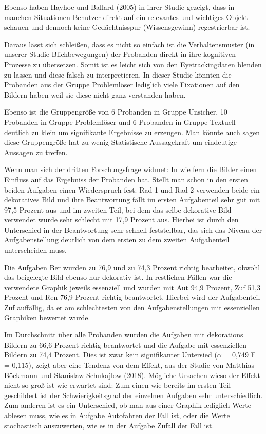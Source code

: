 Ebenso haben Hayhoe und Ballard (2005) in ihrer Studie gezeigt, dass in manchen Situationen Benutzer direkt auf ein relevantes und wichtiges Objekt schauen und dennoch keine Gedächtnisspur (Wissensgewinn) regestrierbar ist\cite{hayhoe2005eye}. 

Daraus lässt sich schleißen, dass es nicht so einfach ist die Verhaltensmuster (in unserer Studie Blichbewegungen) der Probanden direkt in ihre kognitiven Prozesse zu übersetzen. Somit ist es leicht sich von den Eyetrackingdaten blenden zu lassen und diese falsch zu interpretieren. In dieser Studie könnten die Probanden aus der Gruppe Problemlöser lediglich viele Fixationen auf den Bildern haben weil sie diese nicht ganz verstanden haben. 

Ebenso ist die Gruppengröße von 6 Probanden in Gruppe Unsicher, 10 Probanden in Gruppe Problemlöser und 6 Probanden in Gruppe Textuell deutlich zu klein um signifikante Ergebnisse zu erzeugen. Man könnte auch sagen diese Gruppengröße hat zu wenig Statistische Aussagekraft um eindeutige Aussagen zu treffen. 

Wenn man sich der dritten Forschungsfrage widmet: In wie fern die Bilder einen Einfluss auf das Ergebniss der Probanden hat. Stellt man schon in den ersten beiden Aufgaben einen Wiederspruch fest: \gls{Rad} 1 und \gls{Rad} 2 verwenden beide ein dekoratives Bild und ihre Beantwortung fällt im ersten Aufgabenteil sehr gut mit 97,5 Prozent aus und im zweiten Teil, bei dem das selbe dekorative Bild verwendet wurde sehr schlecht mit 17,9 Prozent aus. Hierbei ist durch den Unterschied in der Beantwortung sehr schnell feststellbar, das sich das Niveau der Aufgabenstellung deutlich von dem ersten zu dem zweiten Aufgabenteil unterscheiden muss.

Die Aufgaben \gls{Ber} wurden zu 76,9 und zu 74,3 Prozent richtig bearbeitet, obwohl das beigelegte Bild ebenso nur dekorativ ist. In restlichen Fällen war die verwendete Graphik jeweils essenziell und wurden mit \gls{Aut} 94,9 Prozent, \gls{Zuf} 51,3 Prozent und \gls{Ren} 76,9 Prozent richtig beantwortet. Hierbei wird der Aufgabenteil \gls{Zuf} auffällig, da er am schlechtesten von den Aufgabenstellungen mit essenziellen Graphiken bewertet wurde. 

Im Durchschnitt über alle Probanden wurden die Aufgaben mit dekorations Bildern zu 66,6 Prozent richtig beantwortet und die Aufgabe mit essenziellen Bildern zu 74,4 Prozent. Dies ist zwar kein signifikanter Untersied ($\alpha$ = 0,749 F = 0,115), zeigt aber eine Tendenz von dem  Effekt, aus der Studie von Matthias Böckmann und Stanislaw Schukajlow (2018). Mögliche Ursachen wieso der Effekt nicht so groß ist wie erwartet sind: Zum einen wie bereits im ersten Teil geschildert ist der Schwierigkeitsgrad der einzelnen Aufgaben sehr unterschiedlich. Zum anderen ist es ein Unterschied, ob man aus einer Graphik lediglich Werte ablesen muss, wie es in Aufgabe Autofahren der Fall ist, oder die Werte stochastisch auszuwerten, wie es in der Aufgabe Zufall der Fall ist. 

